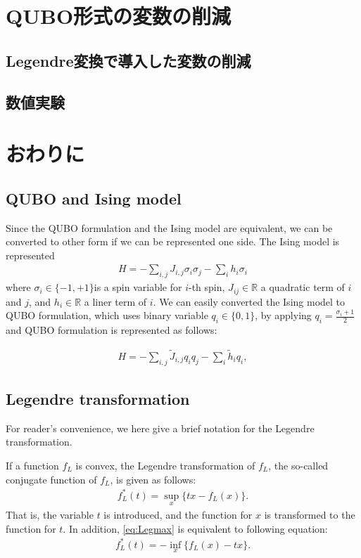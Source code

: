 \documentclass[fp,twocolumn]{jpsj3}
\begin{document}
\section{QUBO形式の変数の削減}
\subsection{Legendre変換で導入した変数の削減}
\subsection{数値実験}
\section{おわりに}

\subsection{QUBO and Ising model} %
Since the QUBO formulation and the Ising model are equivalent, we can be converted to other form if we can be represented one side. The Ising model is represented 
\begin{eqnarray}
  H=-\sum_{i,j}{J_{i,j}\sigma_{i}\sigma_{j}}-\sum_{i}{h_{i}\sigma_{i}}
\end{eqnarray}
where $\sigma_{i}\in \{-1,+1\}$is a spin variable for $i$-th spin, $J_{ij}\in \mathbb{R}$ a quadratic term of $i$ and $j$, and $h_{i}\in \mathbb{R}$ a liner term of $i$. We can easily converted the Ising model to QUBO formulation, which uses binary variable $q_{i}\in \{0,1\}$, by applying $q_{i}=\frac{\sigma_{i}+1}{2}$ and QUBO formulation is represented as follows:

\begin{eqnarray}
  H=-\sum_{i,j}{\widetilde{J}_{i,j}q_{i}q_{j}}-\sum_{i}{\widetilde{h}_{i}q_{i}},
\end{eqnarray}




\subsection{Legendre transformation}

For reader's convenience, we here give a brief notation for the Legendre transformation.

If a function $f_{L}$ is convex, the Legendre transformation of $f_{L}$, the so-called conjugate function of $f_{L}$, is given as follows:
\begin{align}
\label{eq:Legmax}
f_{L}^{*}(t)=\sup_{x}\{t x - f_{L}(x)\}.
\end{align}
That is, the variable $t$ is introduced, and the function for $x$ is transformed to the function for $t$.
In addition, \eqref{eq:Legmax} is equivalent to following equation:
\begin{align}
\label{eq:Legmin}
f_{L}^{*}(t)=-\inf_{x}\{f_{L}(x) - t x\}.
\end{align}
\end{document}
